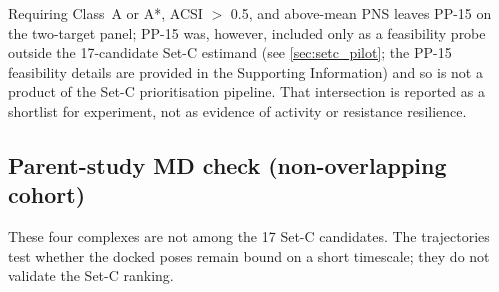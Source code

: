 \documentclass[journal=jcisd8,manuscript=article,layout=traditional]{achemso}
\begin{document}
Requiring Class~A or A*, ACSI $>$ \num{0.5}, and above-mean PNS leaves PP-15 on the two-target panel; PP-15 was, however, included only as a feasibility probe outside the \num{17}-candidate Set-C estimand (see \cref{sec:setc_pilot}; the PP-15 feasibility details are provided in the Supporting Information) and so is not a product of the Set-C prioritisation pipeline. That intersection is reported as a shortlist for experiment, not as evidence of activity or resistance resilience.

\subsection{Parent-study MD check (non-overlapping cohort)}

These four complexes are not among the 17 Set-C candidates. The trajectories test whether the docked poses remain bound on a short timescale; they do not validate the Set-C ranking.

\begin{table}[ht!]
\centering
\caption[MD stability metrics]{Production MD stability metrics for parent-study wild-type complexes (\qty{10}{\nano\second}). BB RMSD, ligand RMSD, minimum distance, contacts, and H-bonds are computed from PBC-unwrapped trajectories.}
\label{tab:md_stability}
\end{table}
\end{document}
